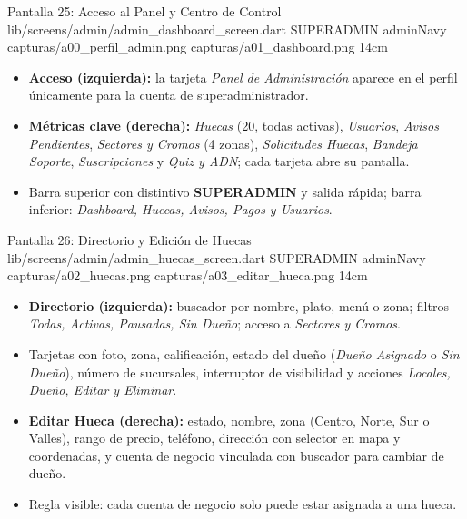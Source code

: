 \pantalladoble
  {Pantalla 25: Acceso al Panel y Centro de Control}
  {lib/screens/admin/admin_dashboard_screen.dart}
  {SUPERADMIN}
  {adminNavy}
  {capturas/a00_perfil_admin.png}
  {capturas/a01_dashboard.png}
  {14cm}
  {
    \begin{itemize}[leftmargin=*, itemsep=2pt]
      \item \textbf{Acceso (izquierda):} la tarjeta \textit{Panel de Administración} aparece en el perfil únicamente para la cuenta de superadministrador.
      \item \textbf{Métricas clave (derecha):} \textit{Huecas} (20, todas activas), \textit{Usuarios}, \textit{Avisos Pendientes}, \textit{Sectores y Cromos} (4 zonas), \textit{Solicitudes Huecas}, \textit{Bandeja Soporte}, \textit{Suscripciones} y \textit{Quiz y ADN}; cada tarjeta abre su pantalla.
      \item Barra superior con distintivo \textbf{SUPERADMIN} y salida rápida; barra inferior: \textit{Dashboard, Huecas, Avisos, Pagos y Usuarios}.
    \end{itemize}
  }

\pantalladoble
  {Pantalla 26: Directorio y Edición de Huecas}
  {lib/screens/admin/admin_huecas_screen.dart}
  {SUPERADMIN}
  {adminNavy}
  {capturas/a02_huecas.png}
  {capturas/a03_editar_hueca.png}
  {14cm}
  {
    \begin{itemize}[leftmargin=*, itemsep=2pt]
      \item \textbf{Directorio (izquierda):} buscador por nombre, plato, menú o zona; filtros \textit{Todas, Activas, Pausadas, Sin Dueño}; acceso a \textit{Sectores y Cromos}.
      \item Tarjetas con foto, zona, calificación, estado del dueño (\textit{Dueño Asignado} o \textit{Sin Dueño}), número de sucursales, interruptor de visibilidad y acciones \textit{Locales, Dueño, Editar y Eliminar}.
      \item \textbf{Editar Hueca (derecha):} estado, nombre, zona (Centro, Norte, Sur o Valles), rango de precio, teléfono, dirección con selector en mapa y coordenadas, y cuenta de negocio vinculada con buscador para cambiar de dueño.
      \item Regla visible: cada cuenta de negocio solo puede estar asignada a una hueca.
    \end{itemize}
  }

